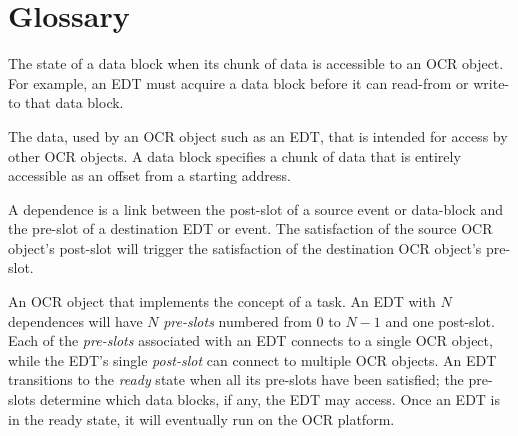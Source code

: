 %
%

%
\section{Glossary}
\label{sec:Glossary}
\glossarydefstart
The state of a data block when its chunk of data is accessible to an
OCR object. For example, an EDT must acquire a data block before it
can read-from or write-to that data block.
\glossarydefend

\glossarydefstart
The data, used by an OCR object such as an EDT, that is intended for
access by other OCR objects. A data block specifies
a chunk of data that is entirely accessible as an offset from a starting address.
\glossarydefend

\glossarydefstart
A dependence is a link between the post-slot of a source event or
data-block and the pre-slot of a destination EDT or event. The
satisfaction of the source OCR object's post-slot will trigger the
satisfaction of the destination OCR object's pre-slot.
\glossarydefend

\glossarydefstart
An OCR object that implements the concept of a task. An EDT with $N$
dependences will have $N$ \emph{pre-slots} numbered from $0$ to $N-1$
and one post-slot.
Each of the \emph{pre-slots} associated with an EDT connects to a
single OCR object, while the EDT’s single \emph{post-slot} can connect
to multiple OCR objects. An EDT transitions to the \emph{ready} state when all its
pre-slots have been satisfied; the pre-slots determine which
data blocks, if any, the EDT may access.  Once an EDT is in the ready state, it will
eventually run on the OCR platform.
\glossarydefend

